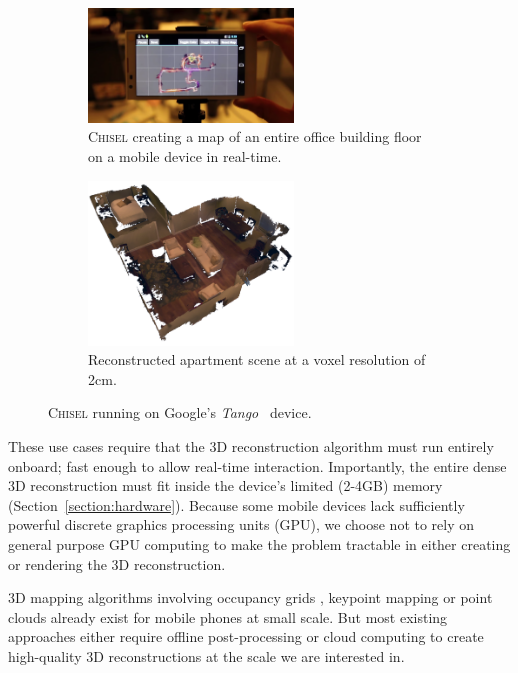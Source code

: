 \documentclass[conference]{IEEEtran}
\newcommand{\sref}[1]{Section~\ref{#1}}
\newcommand{\Tango}{\textit{Tango}\xspace}
\newcommand{\chisel}{\textsc{Chisel}\xspace}
\begin{document}
\begin{figure}[t!]
  \centering
    	 \begin{subfigure}{\linewidth} \centering
		 \includegraphics[width=0.6\textwidth]{img/mapdevice}
		 \caption{\chisel creating a map
      of an entire office building floor on a mobile device in real-time.}
		 \label{fig:map_device}
	 \end{subfigure}
      	 \begin{subfigure}{\linewidth} \centering
		 \includegraphics[width=0.6\textwidth]{img/apartment_scene_color.png}
		 \caption{Reconstructed apartment scene at a voxel resolution of 2cm.}
		 \label{fig:apartment_color}
	 \end{subfigure}
      \caption{\chisel running on Google's \Tango~\cite{Tango} device.}
  \label{fig:first_figure}
\end{figure} 

These use cases require that the 3D reconstruction algorithm must run entirely
onboard; fast enough to allow real-time interaction. Importantly, the entire
dense 3D reconstruction must fit inside the device's limited (2-4GB) memory
(\sref{section:hardware}). Because some mobile devices  lack sufficiently
powerful discrete graphics processing units (GPU), we choose not to rely on general
purpose GPU computing to make the problem tractable in either creating or
rendering the 3D reconstruction.

3D mapping algorithms involving occupancy grids \cite{Elfes1989}, keypoint
mapping \cite{KleinSparse} or point clouds \cite{RusinkiewiczPoints,
TanskanenMetric, WeiseScanning} already exist for mobile phones at small scale.
But most existing approaches either require offline post-processing or cloud
computing to create high-quality 3D reconstructions at the scale we are
interested in.
\end{document}
